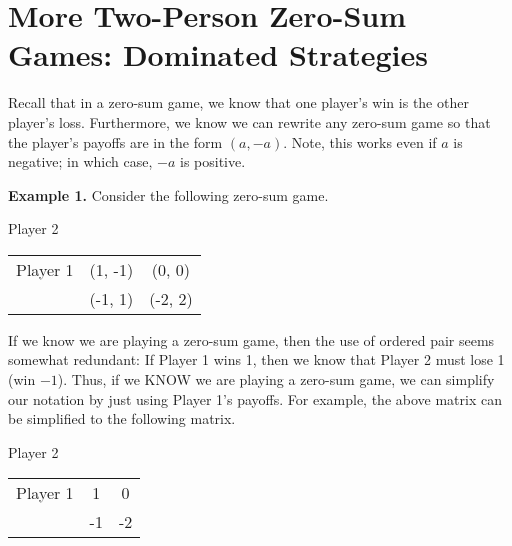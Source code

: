 
\section{More Two-Person Zero-Sum Games: Dominated Strategies}


\vspace{.2in}


Recall that in a zero-sum game, we know that one player's win is the other player's loss. Furthermore, we know we can rewrite any zero-sum game so that the player's payoffs are in the form $(a, -a)$. Note, this works even if $a$ is negative; in which case, $-a$ is positive.

{\bf Example 1.} Consider the following zero-sum game.

\hspace{1.2in}Player 2

\begin{tabular}{l|c|c|}\cline{2-3}
Player 1&(1, -1)&(0, 0)\\ \cline{2-3}
&(-1, 1)&(-2, 2)\\ \cline{2-3}

\end{tabular}
\medskip

If we know we are playing a zero-sum game, then the use of ordered pair seems somewhat redundant: If Player 1 wins 1, then we know that Player 2 must lose 1 (win $-1$). Thus, if we KNOW we are playing a zero-sum game, we can simplify our notation by just using Player 1's payoffs. For example, the above matrix can be simplified to the following matrix. 

\hspace{.8in}Player 2

\begin{tabular}{l|c|c|}\cline{2-3}
Player 1&1&0\\ \cline{2-3}
&-1&-2\\ \cline{2-3}

\end{tabular}
\medskip

